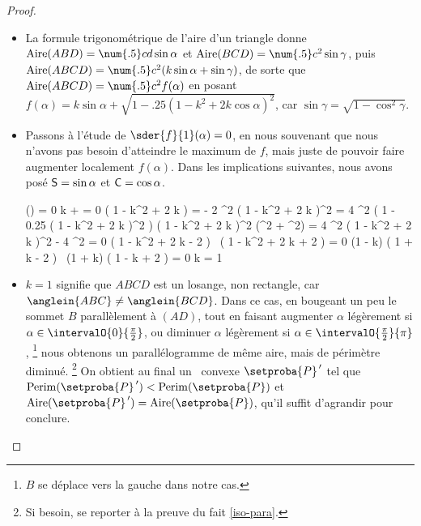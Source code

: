 \begin{proof}
\begin{itemize}
	    \item La formule trigonométrique de l'aire d'un triangle donne
	    $\area{ABD} = \num{.5} c d \sin \alpha$
	    et
	    $\area{BCD} = \num{.5} c^2 \sin \gamma$,
	   	puis
	    $\area{ABCD} = \num{.5} c^2 ( k \sin \alpha + \sin \gamma )$,
	    de sorte que
    	$\area{ABCD} = \num{.5} c^2 f(\alpha)$
    	en posant 
    	$f(\alpha) = k \sin \alpha + \sqrt{1 - \num{.25} ( 1 - k^2 + 2 k \cos \alpha)^2}$,
	    car 
	    $\sin \gamma = \sqrt{1 - \cos^2 \gamma}$.


	    \item Passons à l'étude de $\sder{f}{1}(\alpha) = 0$, en nous souvenant que nous n'avons pas besoin d'atteindre le maximum de $f$, mais juste de pouvoir faire augmenter localement $f(\alpha)$. 
	    Dans les implications suivantes, nous avons posé 
	    $\mathsf{S} = \sin \alpha$ et $\mathsf{C} = \cos \alpha$.
	    
	    \begin{stepcalc}[style=ar*, ope={\implies[d'où]}]
	        (\alpha) = 0
	    \explnext{}
	        k 
	        +
	        =
	        0
	    \explnext{}
	         ( 1 - k^2 + 2 k ) 
	        =
	        - 2  
	    \explnext{}
	        ^2 ( 1 - k^2 + 2 k )^2
	        =
	        4 ^2 \big( 1 - \num{.25} ( 1 - k^2 + 2 k )^2 \big)
	    \explnext{}
	        ( 1 - k^2 + 2 k )^2 (^2 + ^2)
	        =
	        4 ^2
	        ( 1 - k^2 + 2 k )^2 - 4 ^2 = 0
	    \explnext{}
	        ( 1 - k^2 + 2 k  - 2  )
	        \,
	        ( 1 - k^2 + 2 k  + 2  )
	        = 0
	    \explnext{}
	        (1 - k) ( 1 + k - 2  )
	        \,
	        (1 + k) ( 1 - k + 2  ) = 0
	        k = 1
	        \,\,  \,\,
	         \in {}
	    \end{stepcalc}


	    \item $k = 1$ signifie que $ABCD$ est un losange, non rectangle, car $\anglein{ABC} \neq \anglein{BCD}$.
	    Dans ce cas, en bougeant un peu le sommet $B$ parallèlement à $(AD)$, tout en faisant
	    augmenter $\alpha$ légèrement si $\alpha \in \intervalO{0}{\frac{\pi}{2}}$,
	    ou
	    diminuer $\alpha$ légèrement si $\alpha \in \intervalO{\frac{\pi}{2}}{\pi}$,%
	    \footnote{
	        $B$ se déplace vers la gauche dans notre cas.
	    }
	    nous obtenons un parallélogramme de même aire, mais de périmètre diminué.%
	    \footnote{
	        Si besoin, se reporter à la preuve du fait \ref{iso-para}.
	    }
	    On obtient au final un \ngone\ convexe $\primeit{\setproba{P}}$ tel que
		$\perim{\primeit{\setproba{P}}} < \perim{\setproba{P}}$
		et
		$\area{\primeit{\setproba{P}}} = \area{\setproba{P}}$,
		qu'il suffit d'agrandir pour conclure.



\end{itemize}
\end{proof}
